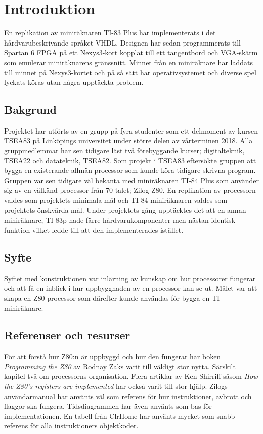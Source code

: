 \documentclass[main.tex]{subfiles}
\begin{document}
\section{Introduktion}
En replikation av miniräknaren TI-83 Plus har implementerats i det
hårdvarubeskrivande språket VHDL. Designen har sedan programmerats till Spartan
6 FPGA på ett Nexys3-kort kopplat till ett tangentbord och VGA-skärm som
emulerar miniräknarens gränssnitt. Minnet från en miniräknare har laddats till
minnet på Nexys3-kortet och på så sätt har operativsystemet och diverse spel
lyckats köras utan några upptäckta problem.

\subsection{Bakgrund}
Projektet har utförts av en grupp på fyra studenter som ett delmoment av kursen
TSEA83 på Linköpings universitet under större delen av vårterminen 2018. Alla
gruppmedlemmar har sen tidigare läst två förebyggande kurser; digitalteknik,
TSEA22 och datateknik, TSEA82. Som projekt i TSEA83 eftersökte gruppen att
bygga en existerande allmän processor som kunde köra tidigare skrivna program.
Gruppen var sen tidigare väl bekanta med miniräknaren TI-84 Plus som använder
sig av en välkänd processor från 70-talet; Zilog Z80. En replikation av
processorn valdes som projektets minimala mål och TI-84-miniräknaren valdes som
projektets önskvärda mål. Under projektets gång upptäcktes det att en annan
miniräknare, TI-83p hade färre hårdvarukomponenter men nästan identisk funktion
vilket ledde till att den implementerades istället.

\subsection{Syfte}
Syftet med konstruktionen var inlärning av kunskap om hur processorer fungerar
och att få en inblick i hur uppbyggnaden av en processor kan se ut. Målet var
att skapa en Z80-processor som därefter kunde användas för bygga en
TI-miniräknare.

\subsection{Referenser och resurser}
För att förstå hur Z80:n är uppbyggd och hur den fungerar har boken {\it
Programming the Z80}\cite{zaks-z80prog} av Rodnay Zaks varit till väldigt stor
nytta. Särskilt kapitel två om processorns organisation. Flera artiklar av Ken
Shirriff såsom {\it How the Z80's registers are implemented}\cite{shirriff-reg}
har också varit till stor hjälp. Zilogs användarmanual\cite{z80um} har använts
väl som referens för hur instruktioner, avbrott och flaggor ska fungera.
Tidsdiagrammen har även använts som bas för implementationen. En tabell från
ClrHome\cite{clrhome} har använts mycket som snabb referens för alla
instruktioners objektkoder.
\end{document}
